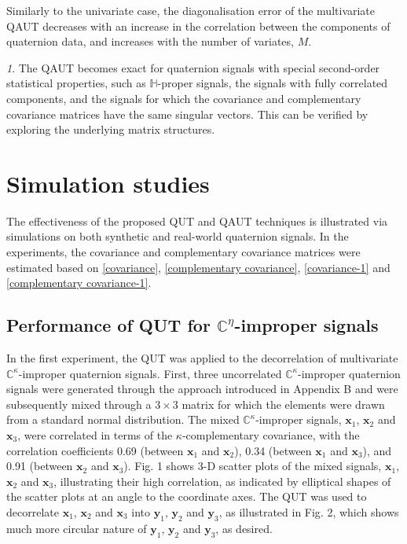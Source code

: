 \documentclass[review]{elsarticle}
\theoremstyle{plain}
\theoremstyle{remark}
\newtheorem{rem}{\protect\remarkname}
\theoremstyle{plain}
\theoremstyle{definition}
\theoremstyle{prop}
\theoremstyle{definition}
\theoremstyle{plain}
\theoremstyle{plain}
\providecommand{\remarkname}{Remark}
\begin{document}
Similarly to the univariate case, the diagonalisation error of the multivariate QAUT decreases with an increase in the correlation between the components of quaternion data, and increases with the number of variates, $M$.
\begin{rem} 
The QAUT becomes exact for quaternion signals with special second-order statistical properties, such as $\mathbb{H}$-proper signals, the signals with fully correlated components, and the signals  
for which the covariance and complementary covariance matrices have the same singular vectors. This can be verified by exploring the underlying matrix structures.
\end{rem}
\section{Simulation studies}\label{sect: simulation}
The effectiveness of the proposed QUT and QAUT techniques is illustrated via simulations on both synthetic and real-world quaternion signals. In the experiments, the covariance and complementary covariance matrices were estimated based on \eqref{covariance}, \eqref{complementary covariance}, \eqref{covariance-1} and \eqref{complementary covariance-1}.  
\subsection{Performance of QUT for $\mathbb{C}^\eta$-improper signals}
In the first experiment, the QUT was applied to the decorrelation of multivariate $\mathbb{C}^\kappa$-improper quaternion signals. First, three uncorrelated $\mathbb{C}^\kappa$-improper quaternion signals were generated through the approach introduced in Appendix B and were subsequently mixed
through a $3\times3$ matrix for which the elements were drawn from a standard normal
distribution. The mixed $\mathbb{C}^\kappa$-improper signals, $\mathbf{x}_1$, $\mathbf{x}_2$ and $\mathbf{x}_3$, were correlated in terms of the $\kappa$-complementary covariance, with the correlation coefficients 0.69 (between $\mathbf{x}_1$ and $\mathbf{x}_2$), 0.34 (between $\mathbf{x}_1$ and $\mathbf{x}_3$), and 0.91 (between $\mathbf{x}_2$ and $\mathbf{x}_3$). Fig. 1 shows 3-D scatter plots of the mixed signals, $\mathbf{x}_1$, $\mathbf{x}_2$ and $\mathbf{x}_3$, illustrating their high correlation, as indicated by elliptical shapes of the scatter plots at an angle to the coordinate axes. The QUT was used to decorrelate $\mathbf{x}_1$, $\mathbf{x}_2$ and $\mathbf{x}_3$ into $\mathbf{y}_1$, $\mathbf{y}_2$ and $\mathbf{y}_3$, as illustrated in Fig. 2, which shows much more circular nature of $\mathbf{y}_1$, $\mathbf{y}_2$ and $\mathbf{y}_3$, as desired.
\end{document}
